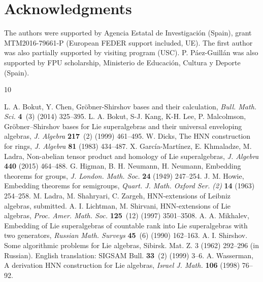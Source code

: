 \documentclass[reqno]{amsart}
\theoremstyle{definition}
\theoremstyle{remark}
\numberwithin{equation}{section}
\begin{document}
\section*{Acknowledgments}

The authors were supported by  Agencia Estatal de Investigaci\'on (Spain), grant MTM2016-79661-P (European FEDER support included, UE).
 The first author was also partially supported by  visiting
program (USC).
P. P\'aez-Guill\'an was also supported by FPU scholarship, Ministerio de Educaci\'on, Cultura
y Deporte (Spain).

%
\begin{thebibliography}{10}

 L. A. Bokut, Y. Chen, Gr\"obner-Shirshov bases and their calculation, \textit{Bull. Math. Sci.} \textbf{4}~(3) (2014) 325--395.
 L. A. Bokut, S-J. Kang, K-H. Lee, P. Malcolmson, Gr\"obner–Shirshov bases for Lie superalgebras and their universal enveloping algebras, \textit{J. Algebra} \textbf{217}~(2) (1999) 461--495.
 W. Dicks, The HNN construction for rings, \textit{J. Algebra} \textbf{81} (1983)  434--487.
 X. Garc\'ia-Mart\'inez, E. Khmaladze, M. Ladra,   Non-abelian tensor product and homology of Lie superalgebras, \textit{J. Algebra} \textbf{440} (2015) 464--488.
 G. Higman, B. H. Neumann, H. Neumann, Embedding theorems for groups, \textit{J. London. Math. Soc.} \textbf{24} (1949) 247--254.
 J. M. Howie, Embedding theorems for semigroups, \textit{ Quart. J. Math. Oxford Ser. (2)}  \textbf{14} (1963) 254--258.
 M. Ladra, M. Shahryari, C. Zargeh, HNN-extensions of Leibniz algebras, submitted.
 A. I. Lichtman, M. Shirvani, HNN-extensions of Lie algebras,\textit{ Proc. Amer. Math. Soc.} \textbf{125}~(12) (1997) 3501--3508.
 A. A. Mikhalev, Embedding of Lie superalgebras of countable rank into Lie superalgebras with two generators, \textit{Russian Math. Surveys} \textbf{45}~(6) (1990) 162--163.
 A. I. Shirshov. Some algorithmic problems for Lie algebras, Sibirsk. Mat. Z. 3 (1962) 292--296 (in Russian). English translation: SIGSAM Bull. \textbf{33}~(2) (1999) 3--6.
 A. Wasserman,  A derivation HNN construction for Lie algebras, \textit{Israel J. Math.} \textbf{106} (1998) 76--92.
\end{thebibliography}
\end{document}
